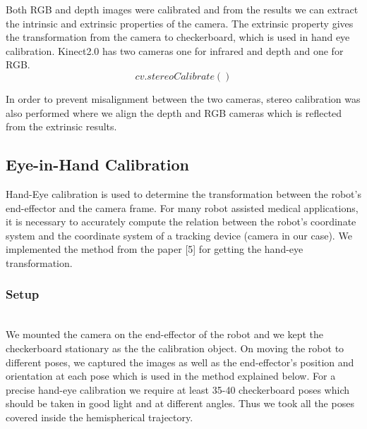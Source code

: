 Both RGB and depth images were calibrated and from the results we can extract the intrinsic and extrinsic properties of the camera. The extrinsic property gives the transformation from the camera to checkerboard, which is used in hand eye calibration. Kinect2.0 has two cameras one for infrared and depth and one for RGB.
\begin{equation}
cv.stereoCalibrate()
\end{equation}

In order to prevent misalignment between the two cameras, stereo calibration was also performed where we align the depth and RGB cameras which is reflected from the extrinsic results.

\subsection{Eye-in-Hand Calibration}\label{AA}
Hand-Eye calibration is used to determine the transformation between the robot's end-effector and the camera frame. For many robot assisted medical applications, it is necessary to accurately compute the relation between the robot's coordinate system and the coordinate system of a tracking device (camera in our case). We implemented the method from the paper [5] for getting the hand-eye transformation.
\subsubsection{Setup}~\\
We mounted the camera on the end-effector of the robot and we kept the checkerboard stationary as the the calibration object. On moving the robot to different poses, we captured the images as well as the end-effector's position and orientation at each pose which is used in the method explained below. For a precise hand-eye calibration we require at least 35-40 checkerboard poses which should be taken in good light and at different angles. Thus we took all the poses covered inside the hemispherical trajectory.
